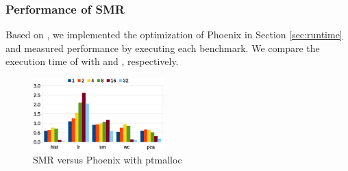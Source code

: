 %
%
%



\subsubsection{Performance of SMR}
Based on \myth, we implemented the optimization of Phoenix in Section \ref{sec:runtime} and measured \myds performance by executing each benchmark. 
We compare the execution time of \myds with  and , respectively.
\begin{figure}[!h!t]  
	\centering
	\includegraphics[width=0.45\textwidth]{eps/dmr_time_array.eps}
	\caption{SMR versus Phoenix with ptmalloc}
	\label{fig:smr:time:ptmalloc}
\end{figure}


